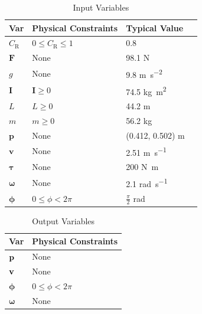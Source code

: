 \documentclass[12pt]{article}
\begin{document}
\renewcommand{\thetable}{1}
\begin{table}[!h]
\renewcommand{\arraystretch}{1.2}
\noindent \begin{longtable}{l l l c} 
  \toprule
  \textbf{Var} & \textbf{Physical Constraints} & \textbf{Typical Value} \\
  \midrule 
  $C_\text{R}$  	& $ 0 \le C_\text{R} \le 1$	& 0.8 
  \\
  $\mathbf{F}$	&	None			& 98.1 \si{\newton}
  \\
  $g$			& None			& 9.8 \si{\metre\per\second\tothe{2}}	
  \\
  $\mathbf{I}$   & $\mathbf{I} \ge 0$ & 74.5 \si{\kilogram\metre\tothe{2}}
  \\
  $L$ 			& $L\ge0$			&44.2 \si{\metre}
  \\
  $m$			& $m \ge 0$		&	56.2 \si{\kilogram} 
  \\
  $\mathbf{p}$		& None			& (0.412, 0.502) \si{\metre}	
  \\
  $\mathbf{v}$			 & None 			& 2.51 \si{\metre\per\second}	
  \\
  $\boldsymbol{\tau}$ & None		& 200 \si{\newton\metre} 
  \\
  $\boldsymbol \omega$ 		& None 			& 2.1 \si{\radian\per\second}
  \\
  $\boldsymbol \phi$		 & $ 0 \le \phi< 2\pi $	&$\frac{\pi}{2} $ \si{\radian}
  \\

  \bottomrule
\end{longtable}
\bigskip
\caption{Input Variables} \label{TblInputVar}
\end{table}

\renewcommand{\thetable}{2}
\begin{table}[!h]
\renewcommand{\arraystretch}{1.2}
\noindent \begin{longtable}{l l} 
  \toprule
  \textbf{Var} & \textbf{Physical Constraints} \\
  \midrule 
  $\bf p$ 		& None
  \\
  $\bf v$ 		& None
  \\
  $\boldsymbol \phi$	&$ 0 \le \phi< 2\pi $
  \\
  $\boldsymbol \omega$	& None
  \\
  \bottomrule
\end{longtable}
\bigskip
\caption{Output Variables} \label{TblOutputVar}
\end{table}
\end{document}
